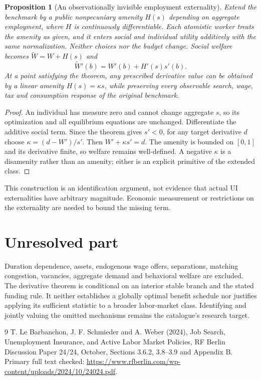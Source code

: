\documentclass[11pt]{article}
\newtheorem{proposition}{Proposition}
\theoremstyle{definition}
\begin{document}
\begin{proposition}[An observationally invisible employment externality]
Extend the benchmark by a public nonpecuniary amenity $H(s)$ depending on aggregate employment, where $H$ is continuously differentiable. Each atomistic worker treats the amenity as given, and it enters social and individual utility additively with the same normalization. Neither choices nor the budget change. Social welfare becomes $\widetilde W=W+H(s)$ and
\[
 \widetilde W'(b)=W'(b)+H'(s)s'(b).
\]
At a point satisfying the theorem, any prescribed derivative value can be obtained by a linear amenity $H(s)=\kappa s$, while preserving every observable search, wage, tax and consumption response of the original benchmark.
\end{proposition}
\begin{proof}
An individual has measure zero and cannot change aggregate $s$, so its optimization and all equilibrium equations are unchanged. Differentiate the additive social term. Since the theorem gives $s'<0$, for any target derivative $d$ choose $\kappa=(d-W')/s'$. Then $W'+\kappa s'=d$. The amenity is bounded on $[0,1]$ and its derivative finite, so welfare remains well-defined. A negative $\kappa$ is a disamenity rather than an amenity; either is an explicit primitive of the extended class.
\end{proof}
This construction is an identification argument, not evidence that actual UI externalities have arbitrary magnitude. Economic measurement or restrictions on the externality are needed to bound the missing term.

\section*{Unresolved part}
Duration dependence, assets, endogenous wage offers, separations, matching congestion, vacancies, aggregate demand and behavioral welfare are excluded. The derivative theorem is conditional on an interior stable branch and the stated funding rule. It neither establishes a globally optimal benefit schedule nor justifies applying its sufficient statistic to a broader labor-market class. Identifying and jointly valuing the omitted mechanisms remains the catalogue's research target.
\begin{thebibliography}{9}
 T. Le Barbanchon, J. F. Schmieder and A. Weber (2024), Job Search, Unemployment Insurance, and Active Labor Market Policies, RF Berlin Discussion Paper 24/24, October, Sections 3.6.2, 3.8--3.9 and Appendix B. Primary full text checked: \url{https://www.rfberlin.com/wp-content/uploads/2024/10/24024.pdf}.
\end{thebibliography}
\end{document}
